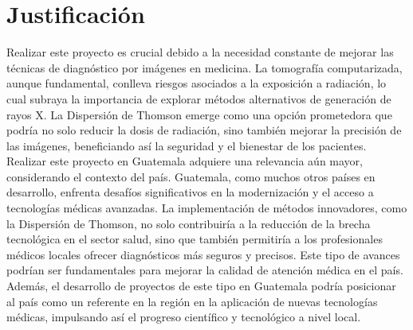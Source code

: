 \vspace*{\fill}


\section{Justificación}




Realizar este proyecto es crucial debido a la necesidad constante de mejorar las técnicas de diagnóstico por imágenes en medicina. La tomografía computarizada, aunque fundamental, conlleva riesgos asociados a la exposición a radiación, lo cual subraya la importancia de explorar métodos alternativos de generación de rayos X. La Dispersión de Thomson emerge como una opción prometedora que podría no solo reducir la dosis de radiación, sino también mejorar la precisión de las imágenes, beneficiando así la seguridad y el bienestar de los pacientes. \\

Realizar este proyecto en Guatemala adquiere una relevancia aún mayor, considerando el contexto del país. Guatemala, como muchos otros países en desarrollo, enfrenta desafíos significativos en la modernización y el acceso a tecnologías médicas avanzadas. La implementación de métodos innovadores, como la Dispersión de Thomson, no solo contribuiría a la reducción de la brecha tecnológica en el sector salud, sino que también permitiría a los profesionales médicos locales ofrecer diagnósticos más seguros y precisos. Este tipo de avances podrían ser fundamentales para mejorar la calidad de atención médica en el país. Además, el desarrollo de proyectos de este tipo en Guatemala podría posicionar al país como un referente en la región en la aplicación de nuevas tecnologías médicas, impulsando así el progreso científico y tecnológico a nivel local. \\

